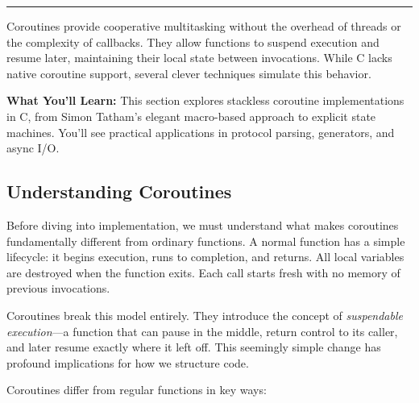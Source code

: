 \noindent\rule{\textwidth}{0.4pt}

Coroutines provide cooperative multitasking without the overhead of threads or the complexity of callbacks. They allow functions to suspend execution and resume later, maintaining their local state between invocations. While C lacks native coroutine support, several clever techniques simulate this behavior.

\begin{notebox}
\textbf{What You'll Learn:} This section explores stackless coroutine implementations in C, from Simon Tatham's elegant macro-based approach to explicit state machines. You'll see practical applications in protocol parsing, generators, and async I/O.
\end{notebox}

\subsection{Understanding Coroutines}

Before diving into implementation, we must understand what makes coroutines fundamentally different from ordinary functions. A normal function has a simple lifecycle: it begins execution, runs to completion, and returns. All local variables are destroyed when the function exits. Each call starts fresh with no memory of previous invocations.

Coroutines break this model entirely. They introduce the concept of \textit{suspendable execution}---a function that can pause in the middle, return control to its caller, and later resume exactly where it left off. This seemingly simple change has profound implications for how we structure code.

Coroutines differ from regular functions in key ways:

